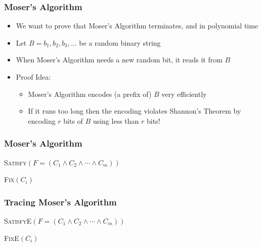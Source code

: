 \documentclass{beamer}
\begin{document}
\frame
{
  \frametitle{Moser's Algorithm}
  \begin{itemize}
    \item We want to prove that Moser's Algorithm terminates, and in
polynomial time
    \item Let $B=b_1,b_2,b_3,\ldots$ be a random binary string
    \item When Moser's Algorithm needs a new random bit, it reads it from $B$
    \item Proof Idea:
    \begin{itemize}
      \item Moser's Algorithm encodes (a prefix of) $B$ very efficiently
      \item If it runs too long then the encoding violates Shannon's Theorem
        by encoding $r$ bits of $B$ using less than $r$ bits!
    \end{itemize}
  \end{itemize}
}

\frame
{
  \frametitle{Moser's Algorithm}

  \noindent\textsc{Satisfy$(F=(C_1\wedge C_2\wedge\cdots\wedge C_m))$}
  \begin{algorithmic}
     \ENDIF
   \ENDFOR
  \end{algorithmic}
  \vspace{1ex}
  \noindent\textsc{Fix$(C_i)$}
  \begin{algorithmic}
     \ENDIF
   \ENDFOR
  \end{algorithmic}
}

\frame
{
  \frametitle{Tracing Moser's Algorithm}

  \noindent\textsc{SatisfyE$(F=(C_1\wedge C_2\wedge\cdots\wedge C_m))$}
  \begin{algorithmic}
     \ENDIF
   \ENDFOR
  \end{algorithmic}
  \vspace{1ex}
  \noindent\textsc{FixE$(C_i)$}
  \begin{algorithmic}
     \ENDIF
   \ENDFOR
  \end{algorithmic}
}
\end{document}
